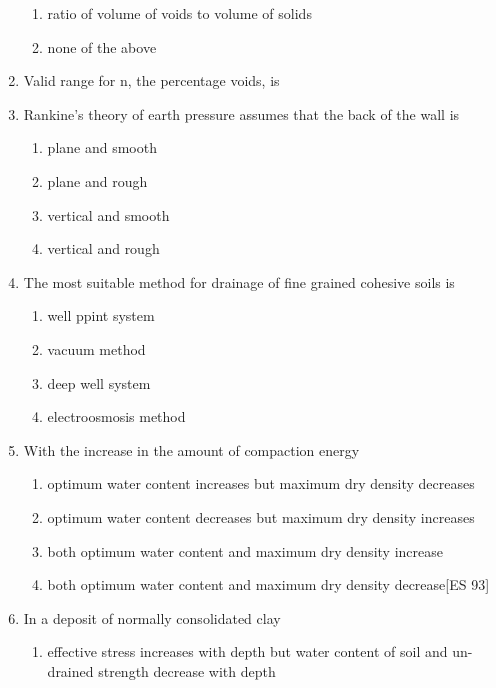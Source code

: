 \documentclass[11pt,a4paper]{article}
\begin{document}
\begin{enumerate}
\begin{enumerate}[label=\Alph*.]
\item{ratio of volume of voids to volume of solids}
\item{none of the above}
\end{enumerate}
\item{Valid range for n, the percentage voids, is}
\\
\item{Rankine's theory of earth pressure assumes that the back of the wall is
}
\begin{enumerate}[label=\Alph*.]
\item{plane and smooth}
\item{plane and rough}
\item{vertical and smooth}
\item{vertical and rough}
\end{enumerate}
\item{The most suitable method for drainage of fine grained cohesive soils is}
\begin{enumerate}[label=\Alph*.]
\item{well ppint system}
\item{vacuum method}
\item{deep well system}
\item{electroosmosis method}
\end{enumerate}
\item{With the increase in the amount of compaction energy}
\begin{enumerate}[label=\Alph*.]
\item{optimum water content increases but maximum dry density decreases}
\item{optimum water content decreases but maximum dry density increases}
\item{both optimum water content and maximum dry density increase}
\item{both optimum water content and maximum dry density decrease[ES 93]}
\end{enumerate}
\item{In a deposit of normally consolidated clay}
\begin{enumerate}[label=\Alph*.]
\item{effective stress increases with depth but water content of soil and un-drained strength decrease with depth}

\end{enumerate}
\end{enumerate}
\end{document}
